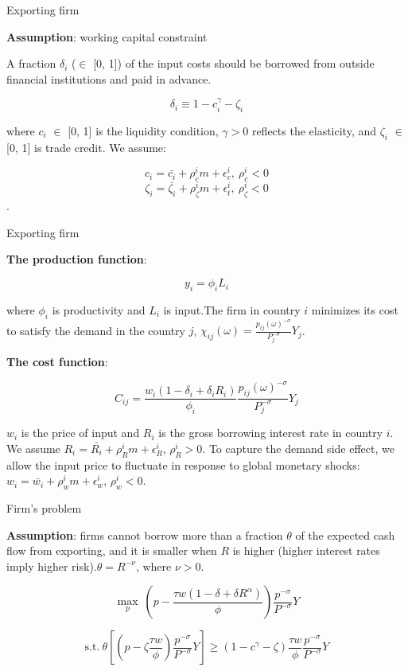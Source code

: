 \documentclass[10pt]{beamer}
\begin{document}
\begin{frame}{Exporting firm}

\textbf{Assumption}: working capital constraint
\vfill

A fraction $\delta_i$ ($\in$ [0, 1]) of the input costs should be borrowed from outside financial institutions and paid in advance.

$$
\delta_i \equiv 1-c_i^\gamma-\zeta_i
$$

where $c_i$ $\in$ [0, 1] is the liquidity condition, $\gamma>0$ reflects the elasticity, and $\zeta_i$ $\in$ [0, 1] is trade credit. We assume:

$$
c_i=\bar{c_i}+\rho_c^i m+\epsilon_c^i,\ \rho_c^i<0
$$
$$
\zeta_i=\bar{\zeta_i}+\rho_\zeta^i m+\epsilon_t^i,\ \rho_\zeta^i<0
$$.

\end{frame}


\begin{frame}{Exporting firm}

\textbf{The production function}:

$$
y_i= \phi_i L_i
$$

where $\phi_i$ is productivity and $L_i$ is input.The firm in country $i$ minimizes its cost to satisfy the demand in the country $j$, $\chi_{ij}(\omega)=\frac{p_{ij}(\omega)^{-\sigma}}{P_j^{-\sigma}} Y_j$.
\vfill

\textbf{The cost function}:

$$
C_{ij}=\frac{w_i(1-\delta_i+\delta_i R_i)}{\phi_i} \frac{p_{ij}(\omega)^{-\sigma}}{P_j^{-\sigma}} Y_j
$$ 

$w_i$ is the price of input and $R_i$ is the gross borrowing interest rate in country $i$. We assume $R_i=\bar{R_i}+\rho_R^i m+\epsilon_R^i$, $\rho_R^i>0$. To capture the demand side effect, we allow the input price to fluctuate in response to global monetary shocks: $w_i=\bar{w_i}+\rho_w^i m + \epsilon_w^i$, $\rho_w^i<0$.

\end{frame}


\begin{frame}{Firm's problem}

\textbf{Assumption}: firms cannot borrow more than a fraction $\theta$ of the expected cash flow from exporting, and it is smaller when $R$ is higher (higher interest rates imply higher risk).$\theta=R^{-\nu}$, where $\nu>0$.
\vfill 

$$
\max_{p} \ (p- \frac{\tau w(1-\delta+\delta R^\alpha)}{\phi}) \frac{p^{-\sigma}}{P^{-\sigma}} Y
$$

\begin{equation}
\text{s.t.} \ \theta [(p-\zeta \frac{\tau w}{\phi}) \frac{p^{-\sigma}}{P^{-\sigma}} Y]\geq(1-c^\gamma-\zeta)\frac{\tau w}{\phi} \frac{p^{-\sigma}}{P^{-\sigma}} Y
\end{equation}

\end{frame}
\end{document}

